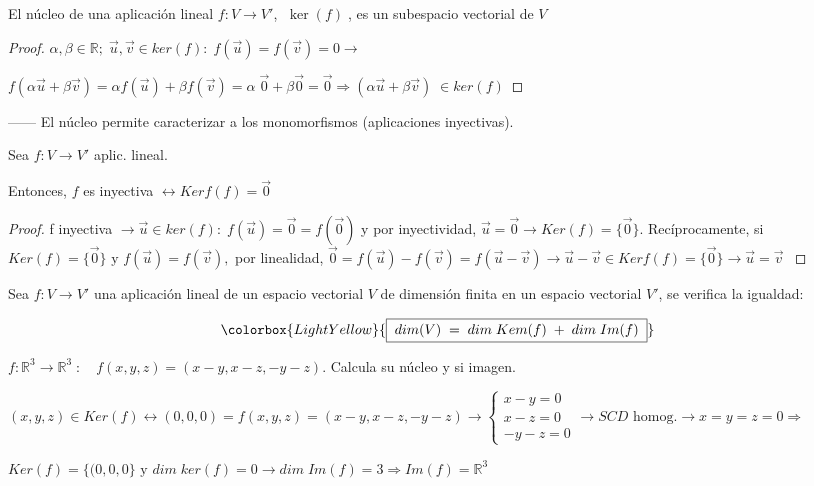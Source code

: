 \begin{prop}
El núcleo de una aplicación lineal $f:V \to V'$, $\;\ker(f)\;$,	es un subespacio vectorial de $V$
\end{prop}
\begin{proof}
\textcolor{gris}{$\alpha, \beta \in \mathbb R; \; \vec u, \vec v \in ker(f): \; f(\vec u)=f(\vec v)=0 \to $}

\noindent \textcolor{gris}{$f(\alpha \vec u + \beta \vec v)=\alpha f(\vec u)+ \beta f(\vec v)  = \alpha \; \vec 0 + \beta \vec 0=\vec 0 \Rightarrow  (\alpha \vec u + \beta \vec v)\; \in ker(f)$}
\end{proof}

------ El núcleo permite caracterizar a los monomorfismos (aplicaciones inyectivas).

\begin{prop}
	Sea $f:V\to V'$ aplic. lineal. 
	
	Entonces, $f$ es inyectiva $\leftrightarrow Kerf(f)=\vec 0$
\end{prop}
\begin{proof}
\textcolor{gris}{ f inyectiva $\to  \vec u \in ker(f):\; f(\vec u)=\vec 0=f(\vec 0)$ y por inyectividad, $\vec u = \vec 0 \to Ker(f)=\{ \vec 0 \} $. Recíprocamente, si $Ker(f)=\{\vec 0 \} \text { y } f(\vec u)=f(\vec v),$ por linealidad, $\vec 0= f(\vec u)-f(\vec v)=f(\vec u - \vec v) \to \vec u-\vec v \in Kerf(f)=\{\vec 0\} \to \vec u=\vec v$  }	
\end{proof}

\begin{teor}
Sea $f:V \to V'$ una aplicación lineal de un espacio vectorial $V$ de dimensión finita en un espacio vectorial $V'$, se verifica la igualdad:

\begin{equation*}
	\colorbox{LightYellow}{\boxed{ \; dim(V)\; =\; dim \; Kem(f)\; +\; dim \; Im(f)\; }}
\end{equation*}	
\end{teor}

\begin{ejem}
$f:\mathbb R^3 \to 	\mathbb R^3\; : \quad f(x,y,z)=(x-y,x-z,-y-z)$. Calcula su núcleo y si imagen.

\noindent $(x,y,z) \in Ker (f) \leftrightarrow (0,0,0)= f(x,y,z)=(x-y,x-z,-y-z) \to \begin{cases} x-y=0 \\ x-z=0 \\ -y-z=0 \end{cases} \to SCD \text{ homog.} \to x=y=z=0 \Rightarrow $

\noindent $Ker(f)=\{(0,0,0\} \text{ y } dim\; ker(f)=0 \to dim\; Im(f)=3 \Rightarrow Im(f)=\mathbb R^3$
\end{ejem}

